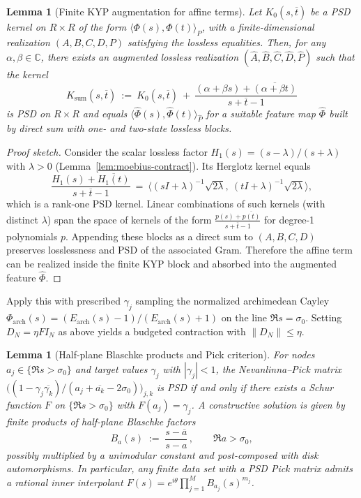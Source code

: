 \documentclass[11pt]{article}
\newtheorem{lemma}[theorem]{Lemma}
\theoremstyle{remark}
\newcommand{\C}{\mathbb{C}}
\begin{document}
\begin{lemma}[Finite KYP augmentation for affine terms]\label{lem:affine-gram}
Let \(K_0(s,\overline t)\) be a PSD kernel on \(R\times R\) of the form \(\langle \Phi(s),\Phi(t)\rangle_{P}\), with a finite-dimensional realization \((A,B,C,D,P)\) satisfying the lossless equalities. Then, for any \(\alpha,\beta\in\C\), there exists an augmented lossless realization \((\widehat A,\widehat B,\widehat C,\widehat D,\widehat P)\) such that the kernel
\[
 K_\mathrm{sum}(s,\overline t)\ :=\ K_0(s,\overline t)\ +\ \frac{(\alpha+\beta s)+\overline{(\alpha+\beta t)}}{s+\overline t -1}
\]
is PSD on \(R\times R\) and equals \(\langle \widehat\Phi(s),\widehat\Phi(t)\rangle_{\widehat P}\) for a suitable feature map \(\widehat\Phi\) built by direct sum with one- and two-state lossless blocks.
\end{lemma}
\begin{proof}[Proof sketch]
Consider the scalar lossless factor \(H_1(s)=(s-\lambda)/(s+\lambda)\) with \(\lambda>0\) (Lemma~\ref{lem:moebius-contract}). Its Herglotz kernel equals
\[\frac{H_1(s)+\overline{H_1(t)}}{s+\overline t -1}\ =\ \Big\langle (sI+\lambda)^{-1}\sqrt{2\lambda},\ (tI+\lambda)^{-1}\sqrt{2\lambda}\Big\rangle,\]
which is a rank-one PSD kernel. Linear combinations of such kernels (with distinct \(\lambda\)) span the space of kernels of the form \(\frac{p(s)+\overline{p(t)}}{s+\overline t-1}\) for degree-1 polynomials \(p\). Appending these blocks as a direct sum to \((A,B,C,D)\) preserves losslessness and PSD of the associated Gram. Therefore the affine term can be realized inside the finite KYP block and absorbed into the augmented feature \(\widehat\Phi\).
\end{proof}

Apply this with prescribed $\gamma_j$ sampling the normalized archimedean Cayley $\Phi_{\mathrm{arch}}(s)=(E_{\mathrm{arch}}(s)-1)/(E_{\mathrm{arch}}(s)+1)$ on the line $\Re s=\sigma_0$. Setting $D_N=\eta F I_N$ as above yields a budgeted contraction with $\|D_N\|\le \eta$.

\begin{lemma}[Half-plane Blaschke products and Pick criterion]\label{lem:halfplane-blaschke}
For nodes $a_j\in\{\Re s>\sigma_0\}$ and target values $\gamma_j$ with $|\gamma_j|<1$, the Nevanlinna--Pick matrix $\big((1-\gamma_j\overline{\gamma_k})/(a_j+\overline{a_k}-2\sigma_0)\big)_{j,k}$ is PSD if and only if there exists a Schur function $F$ on $\{\Re s>\sigma_0\}$ with $F(a_j)=\gamma_j$. A constructive solution is given by finite products of half-plane Blaschke factors
\[
 B_{a}(s)\;:=\;\frac{s-\overline a}{s-a}\,,\qquad \Re a>\sigma_0,
\]
possibly multiplied by a unimodular constant and post-composed with disk automorphisms. In particular, any finite data set with a PSD Pick matrix admits a rational inner interpolant $F(s)=e^{i\theta}\prod_{j=1}^{M} B_{a_j}(s)^{m_j}$.
\end{lemma}
\end{document}
